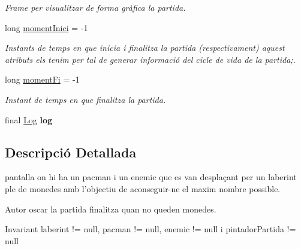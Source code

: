 \begin{DoxyCompactItemize}
\begin{DoxyCompactList}\small\item\em Frame per visualitzar de forma gràfica la partida. \end{DoxyCompactList}\item 
long \hyperlink{classlogica_1_1_partida_ae355797722d1ae3a44d644b818b068f5}{moment\+Inici} = -\/1
\begin{DoxyCompactList}\small\item\em Instants de temps en que inicia i finalitza la partida (respectivament) aquest atributs els tenim per tal de generar informació del cicle de vida de la partida;. \end{DoxyCompactList}\item 
\hypertarget{classlogica_1_1_partida_a7ed4304ae56d5752bce1f576f790e565}{long \hyperlink{classlogica_1_1_partida_a7ed4304ae56d5752bce1f576f790e565}{moment\+Fi} = -\/1}\label{classlogica_1_1_partida_a7ed4304ae56d5752bce1f576f790e565}

\begin{DoxyCompactList}\small\item\em Instant de temps en que finalitza la partida. \end{DoxyCompactList}\item 
\hypertarget{classlogica_1_1_partida_a1dd08cde4519f5208599915deb63e52e}{final \hyperlink{classlogica_1_1log_1_1_log}{Log} {\bfseries log}}\label{classlogica_1_1_partida_a1dd08cde4519f5208599915deb63e52e}

\end{DoxyCompactItemize}


\subsection{Descripció Detallada}
pantalla on hi ha un pacman i un enemic que es van desplaçant per un laberint ple de monedes amb l'objectiu de aconseguir-\/ne el maxim nombre possible. 

\begin{DoxyAuthor}{Autor}
oscar la partida finalitza quan no queden monedes.
\end{DoxyAuthor}
\begin{DoxyInvariant}{Invariant}
laberint != null, pacman != null, enemic != null i pintador\+Partida != null 
\end{DoxyInvariant}



